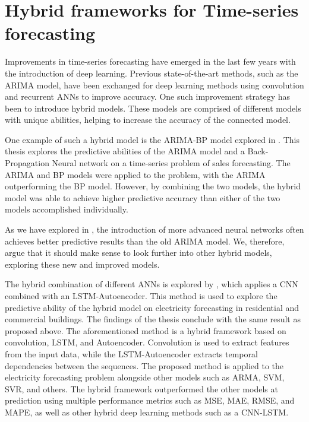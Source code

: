 \section{Hybrid frameworks for Time-series forecasting}
\label{section:RelatedWork:Hybrid}

Improvements in time-series forecasting have emerged in the last few years with the introduction of deep learning.
Previous state-of-the-art methods, such as the ARIMA model, have been exchanged for deep learning methods using convolution and recurrent ANNs to improve accuracy.
One such improvement strategy has been to introduce hybrid models.
These models are comprised of different models with unique abilities, helping to increase the accuracy of the connected model.


One example of such a hybrid model is the ARIMA-BP model explored in \cite{Bowen2020}.
This thesis explores the predictive abilities of the ARIMA model and a Back-Propagation Neural network on a time-series problem of sales forecasting.
The ARIMA and BP models were applied to the problem, with the ARIMA outperforming the BP model.
However, by combining the two models, the hybrid model was able to achieve higher predictive accuracy than either of the two models accomplished individually.

As we have explored in , the introduction of more advanced neural networks often achieves better predictive results than the old ARIMA model.
We, therefore, argue that it should make sense to look further into other hybrid models, exploring these new and improved models.


The hybrid combination of different ANNs is explored by \cite{Khan2020}, which applies a CNN combined with an LSTM-Autoencoder.
This method is used to explore the predictive ability of the hybrid model on electricity forecasting in residential and commercial buildings.
The findings of the thesis conclude with the same result as proposed above.
The aforementioned method is a hybrid framework based on convolution, LSTM, and Autoencoder.
Convolution is used to extract features from the input data, while the LSTM-Autoencoder extracts temporal dependencies between the sequences.
The proposed method is applied to the electricity forecasting problem alongside other models such as ARMA, SVM, SVR, and others.
The hybrid framework outperformed the other models at prediction using multiple performance metrics such as MSE, MAE, RMSE, and MAPE,
as well as other hybrid deep learning methods such as a CNN-LSTM.


